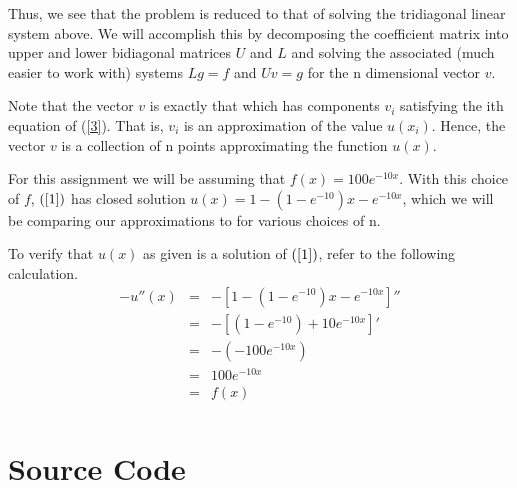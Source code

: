 \documentclass[a4paper, 12pt, twoside]{article}
\begin{document}
Thus, we see that the problem is reduced to that of solving the tridiagonal linear system above. We will accomplish this by decomposing the coefficient matrix into upper and lower bidiagonal matrices $U$ and $L$ and solving the associated (much easier to work with) systems $Lg = f$ and $Uv=g$ for the n dimensional vector $v$.

Note that the vector $v$ is exactly that
which has components $v_i$ satisfying the ith equation of (\ref{3}). That is, $v_i$ is an approximation of the value 
$u(x_i)$. Hence, the vector $v$ is a collection of n points approximating the function $u(x)$.


For this assignment we will be assuming that $f(x) = 100e^{-10x}$. With this choice of $f$, $(\ref{1})$ has closed solution $u(x) = 1-(1-e^{-10})x-e^{-10x}$, which we will be comparing our approximations to for various choices of n. 

To verify that $u(x)$ as given is a solution of $(\ref{1})$, refer to the following calculation.
$$
\begin{array}{ccc}
	-u''(x)& = & -[1-(1-e^{-10})x-e^{-10x}]''\\
	&=&-[(1-e^{-10}) + 10e^{-10x} ]'\\
	&=&-(-100e^{-10x})\\
	&=& 100e^{-10x}\\
	&=& f(x)\\
\end{array}
$$

\newpage
\section{Source Code}
\end{document}
